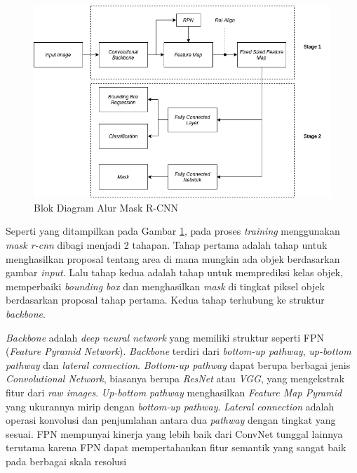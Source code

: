 \documentclass[conference]{IEEEtran}
\begin{document}
	\begin{figure}[ht]
		\centering
		\includegraphics[scale=0.3]{img/mask-rcnn-arch.png}
		\caption{Blok Diagram Alur Mask R-CNN}
		\label{fig:mask-rcnn-arch}
	\end{figure} 
	
	Seperti yang ditampilkan pada Gambar \ref{fig:mask-rcnn-arch}, pada proses \textit{training} menggunakan \textit{mask r-cnn} dibagi menjadi 2 tahapan. Tahap pertama adalah tahap untuk menghasilkan proposal tentang area di mana mungkin ada objek berdasarkan gambar \textit{input}. Lalu tahap kedua adalah tahap untuk memprediksi kelas objek, memperbaiki \textit{bounding box} dan menghasilkan \textit{mask} di tingkat piksel objek berdasarkan proposal tahap pertama. Kedua tahap terhubung ke struktur \textit{backbone}.
	
	\textit{Backbone} adalah \textit{deep neural network} yang memiliki struktur seperti FPN (\textit{Feature Pyramid Network}). \textit{Backbone} terdiri dari \textit{bottom-up pathway}, \textit{up-bottom pathway} dan \textit{lateral connection}. \textit{Bottom-up pathway} dapat berupa berbagai jenis \textit{Convolutional Network}, biasanya berupa \textit{ResNet} atau \textit{VGG}, yang mengekstrak fitur dari \textit{raw images}. \textit{Up-bottom pathway} menghasilkan \textit{Feature Map Pyramid} yang ukurannya mirip dengan \textit{bottom-up pathway}. \textit{Lateral connection} adalah operasi konvolusi dan penjumlahan antara dua \textit{pathway} dengan tingkat yang sesuai. FPN mempunyai kinerja yang lebih baik dari ConvNet tunggal lainnya terutama karena FPN dapat mempertahankan fitur semantik yang sangat baik pada berbagai skala resolusi
	
\end{document}
